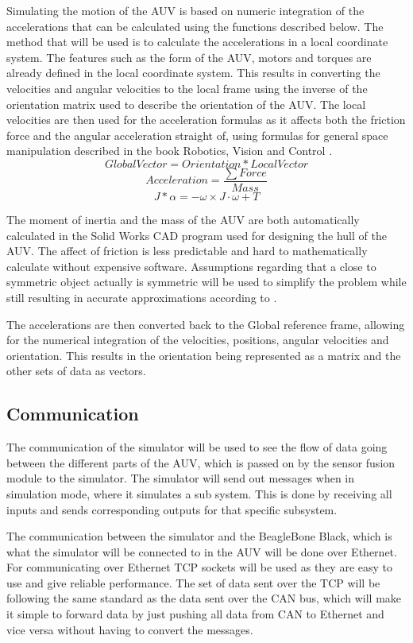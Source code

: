 Simulating the motion of the AUV is based on numeric integration of the accelerations that can be calculated using the functions described below. The method that will be used is to calculate the accelerations in a local coordinate system. The features such as the form of the AUV, motors and torques are already defined in the local coordinate system. This results in converting the velocities and angular velocities to the local frame using the inverse of the orientation matrix used to describe the orientation of the AUV. The local velocities are then used for the acceleration formulas as it affects both the friction force and the angular acceleration straight of, using formulas for general space manipulation described in the book Robotics, Vision and Control \cite{book:corke2013}.
\begin{equation}
Global Vector = Orientation*Local Vector
\end{equation}
\begin{equation}
Acceleration = \frac{\sum Force}{Mass}
\end{equation}
\begin{equation}
J*\alpha = - \omega \times J \cdot\omega + T 
\end{equation}


The moment of inertia and the mass of the AUV are both automatically calculated in the Solid Works CAD program used for designing the hull of the AUV. The affect of friction is less predictable and hard to mathematically calculate without expensive software. Assumptions regarding that a close to symmetric object actually is symmetric will be used to simplify the problem while still resulting in accurate approximations according to \cite{4772083}.

The accelerations are then converted back to the Global reference frame, allowing for the numerical integration of the velocities, positions, angular velocities and orientation. This results in the orientation being represented as a matrix and the other sets of data as vectors.
\subsection{Communication}

The communication of the simulator will be used to see the flow of data going between the different parts of the AUV, which is passed on by the sensor fusion module to the simulator. The simulator will send out messages when in simulation mode, where it simulates a sub system. This is done by receiving all inputs and sends corresponding outputs for that specific subsystem.

The communication between the simulator and the BeagleBone Black, which is what the simulator will be connected to in the AUV will be done over Ethernet. For communicating over Ethernet TCP sockets will be used as they are easy to use and give reliable performance. The set of data sent over the TCP will be following the same standard as the data sent over the CAN bus, which will make it simple to forward data by just pushing all data from CAN to Ethernet and vice versa without having to convert the messages.
